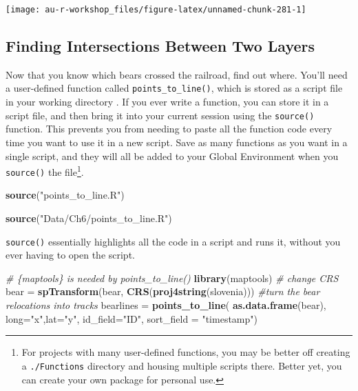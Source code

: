 \documentclass[]{book}
\newenvironment{Shaded}{\begin{snugshade}}{\end{snugshade}}
\newcommand{\KeywordTok}[1]{\textcolor[rgb]{0.13,0.29,0.53}{\textbf{#1}}}
\newcommand{\DataTypeTok}[1]{\textcolor[rgb]{0.13,0.29,0.53}{#1}}
\newcommand{\StringTok}[1]{\textcolor[rgb]{0.31,0.60,0.02}{#1}}
\newcommand{\CommentTok}[1]{\textcolor[rgb]{0.56,0.35,0.01}{\textit{#1}}}
\newcommand{\NormalTok}[1]{#1}
\let\rmarkdownfootnote\footnote%
\def\footnote{\protect\rmarkdownfootnote}
\theoremstyle{definition}
\theoremstyle{definition}
\theoremstyle{definition}
\theoremstyle{remark}
\begin{document}
\begin{center}\texttt{[image: au-r-workshop\_files/figure-latex/unnamed-chunk-281-1]} \end{center}

\subsection{Finding Intersections Between Two
Layers}\label{finding-intersections-between-two-layers}

Now that you know which bears crossed the railroad, find out where.
You'll need a user-defined function called \texttt{points\_to\_line()},
which is stored as a script file in your working directory
\citep{points-line-cite}. If you ever write a function, you can store it
in a script file, and then bring it into your current session using the
\texttt{source()} function. This prevents you from needing to paste all
the function code every time you want to use it in a new script. Save as
many functions as you want in a single script, and they will all be
added to your Global Environment when you \texttt{source()} the
file\footnote{For projects with many user-defined functions, you may be
  better off creating a \texttt{./Functions} directory and housing
  multiple scripts there. Better yet, you can create your own package
  for personal use.}.

\begin{Shaded}
\begin{Highlighting}[]
\KeywordTok{source}\NormalTok{(}\StringTok{"points_to_line.R"}\NormalTok{)}
\end{Highlighting}
\end{Shaded}

\begin{Shaded}
\begin{Highlighting}[]
\KeywordTok{source}\NormalTok{(}\StringTok{"Data/Ch6/points_to_line.R"}\NormalTok{)}
\end{Highlighting}
\end{Shaded}

\texttt{source()} essentially highlights all the code in a script and
runs it, without you ever having to open the script.

\begin{Shaded}
\begin{Highlighting}[]
\CommentTok{# \{maptools\} is needed by points_to_line()}
\KeywordTok{library}\NormalTok{(maptools) }
\CommentTok{# change CRS}
\NormalTok{bear =}\StringTok{ }\KeywordTok{spTransform}\NormalTok{(bear, }\KeywordTok{CRS}\NormalTok{(}\KeywordTok{proj4string}\NormalTok{(slovenia)))}
\CommentTok{#turn the bear relocations into tracks}
\NormalTok{bearlines =}\StringTok{ }\KeywordTok{points_to_line}\NormalTok{(}
  \KeywordTok{as.data.frame}\NormalTok{(bear),}
  \DataTypeTok{long=}\StringTok{"x"}\NormalTok{,}\DataTypeTok{lat=}\StringTok{"y"}\NormalTok{,}
  \DataTypeTok{id_field=}\StringTok{"ID"}\NormalTok{, }\DataTypeTok{sort_field =} \StringTok{"timestamp"}\NormalTok{)}
\end{Highlighting}
\end{Shaded}
\end{document}
